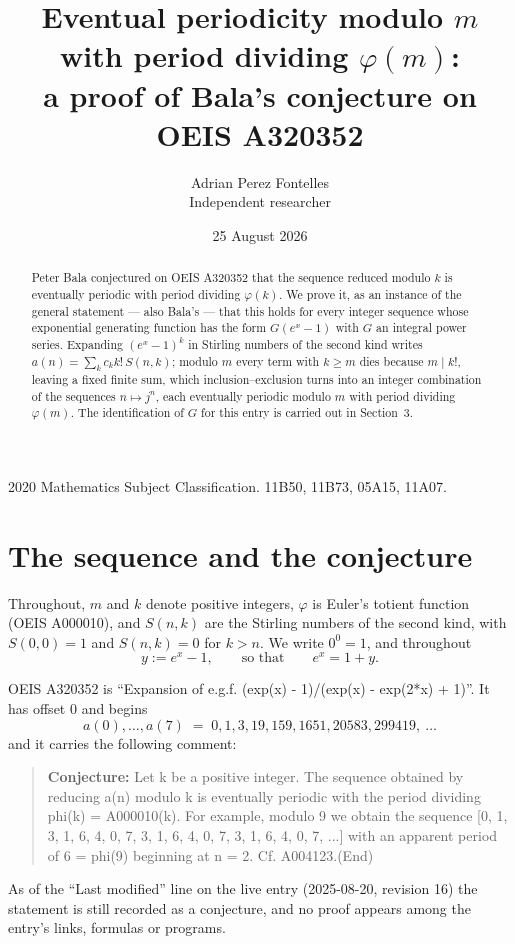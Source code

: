 \documentclass[11pt,a4paper]{article}
\title{Eventual periodicity modulo $m$ with period dividing $\varphi(m)$:\\a proof of Bala's conjecture on OEIS A320352}
\author{Adrian Perez Fontelles\\ \small Independent researcher}
\date{25 August 2026}
\theoremstyle{plain}
\theoremstyle{definition}
\begin{document}
\maketitle

\begin{abstract}
Peter Bala conjectured on OEIS A320352 that the sequence reduced modulo $k$ is eventually periodic with period dividing $\varphi(k)$. We prove it, as an instance of the general statement --- also Bala's --- that this holds for every integer sequence whose exponential generating function has the form $G(e^{x}-1)$ with $G$ an integral power series. Expanding $(e^{x}-1)^{k}$ in Stirling numbers of the second kind writes $a(n)=\sum_{k}c_{k}k!\,S(n,k)$; modulo $m$ every term with $k\ge m$ dies because $m\mid k!$, leaving a fixed finite sum, which inclusion--exclusion turns into an integer combination of the sequences $n\mapsto j^{n}$, each eventually periodic modulo $m$ with period dividing $\varphi(m)$. The identification of $G$ for this entry is carried out in Section~3.
\end{abstract}

\noindent\small 2020 Mathematics Subject Classification. 11B50, 11B73, 05A15, 11A07.\normalsize

\section{The sequence and the conjecture}

Throughout, $m$ and $k$ denote positive integers, $\varphi$ is Euler's totient function
(OEIS A000010), and $S(n,k)$ are the Stirling numbers of the second kind, with
$S(0,0)=1$ and $S(n,k)=0$ for $k>n$. We write $0^{0}=1$, and throughout
\[
y := e^{x}-1, \qquad\text{so that}\qquad e^{x}=1+y .
\]

OEIS A320352 is ``Expansion of e.g.f. (exp(x) - 1)/(exp(x) - exp(2*x) + 1)''. It has offset $0$ and begins
\[
a(0),\dots,a(7)\;=\;0, 1, 3, 19, 159, 1651, 20583, 299419,\ \dots
\]
and it carries the following comment:
\begin{quote}\small
\textbf{Conjecture:} Let k be a positive integer. The sequence obtained by reducing a(n) modulo k is eventually periodic with the period dividing phi(k) = A000010(k). For example, modulo 9 we obtain the sequence [0, 1, 3, 1, 6, 4, 0, 7, 3, 1, 6, 4, 0, 7, 3, 1, 6, 4, 0, 7, ...] with an apparent period of 6 = phi(9) beginning at n = 2. Cf. A004123.(End)
\end{quote}
As of the ``Last modified'' line on the live entry (2025-08-20, revision 16) the
statement is still recorded as a conjecture, and no proof appears among the entry's links,
formulas or programs.
\end{document}
